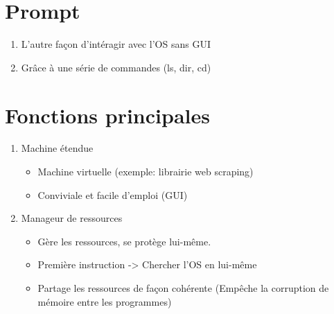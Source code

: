 \section{Prompt}
\begin{enumerate}
\item L'autre façon d'intéragir avec l'OS sans GUI
\item Grâce à une série de commandes (ls, dir, cd)
\end{enumerate}

\section{Fonctions principales}
\begin{enumerate}
\item Machine étendue
\begin{itemize}
  \item Machine virtuelle (exemple: librairie web scraping)
  \item Conviviale et facile d'emploi (GUI)
\end{itemize}

\item Manageur de ressources
\begin{itemize}
  \item Gère les ressources, se protège lui-même.
  \item Première instruction -> Chercher l'OS en lui-même
  \item Partage les ressources de façon cohérente (Empêche la corruption de mémoire entre les programmes)
\end{itemize}
\end{enumerate}

